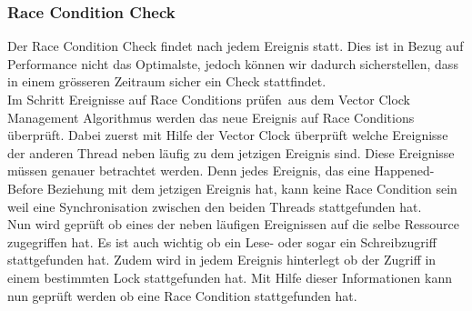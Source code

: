 \documentclass[10pt,a4paper]{article}
\begin{document}
\subsubsection{Race Condition Check}
Der Race Condition Check findet nach jedem Ereignis statt. Dies ist in Bezug auf Performance nicht das Optimalste, jedoch können wir dadurch sicherstellen, dass in einem grösseren Zeitraum sicher ein Check stattfindet.\\
Im Schritt \flqq Ereignisse auf Race Conditions prüfen\frqq\ aus dem Vector Clock Management Algorithmus werden das neue Ereignis auf Race Conditions überprüft. Dabei zuerst mit Hilfe der Vector Clock überprüft welche Ereignisse der anderen Thread neben läufig zu dem jetzigen Ereignis sind. Diese Ereignisse müssen genauer betrachtet werden. Denn jedes Ereignis, das eine Happened-Before Beziehung mit dem jetzigen Ereignis hat, kann keine Race Condition sein weil eine Synchronisation zwischen den beiden Threads stattgefunden hat.\\
Nun wird geprüft ob eines der neben läufigen Ereignissen auf die selbe Ressource zugegriffen hat. Es ist auch wichtig ob ein Lese- oder sogar ein Schreibzugriff stattgefunden hat. Zudem wird in jedem Ereignis hinterlegt ob der Zugriff in einem bestimmten Lock stattgefunden hat. Mit Hilfe dieser Informationen kann nun geprüft werden ob eine Race Condition stattgefunden hat.
\end{document}
